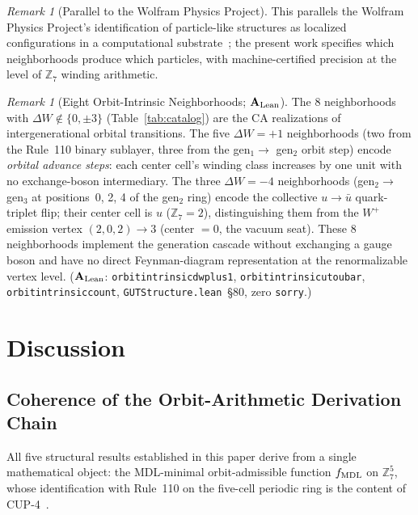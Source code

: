 \documentclass[11pt]{article}
\theoremstyle{remark}
\newtheorem{remark}[theorem]{Remark}
\newcommand{\lean}[1]{%
  \penalty-100
  \begingroup\def\_{\textunderscore\allowbreak}\texttt{#1}\endgroup}
\newcommand{\CatAL}{\ensuremath{\textbf{A}_{\rm Lean}}}
\begin{document}
\begin{remark}[Parallel to the Wolfram Physics Project]
This parallels the Wolfram Physics Project's identification of particle-like
structures as localized configurations in a computational
substrate~\cite{Wolfram2020Tech}; the present work specifies which
neighborhoods produce which particles, with machine-certified precision
at the level of $\mathbb{Z}_7$ winding arithmetic.
\end{remark}

\begin{remark}[Eight Orbit-Intrinsic Neighborhoods; $\CatAL$]
\label{rem:orbit_intrinsic}
The 8 neighborhoods with $\Delta W \notin \{0, \pm 3\}$
(Table~\ref{tab:catalog}) are the CA realizations of intergenerational orbital
transitions.
The five $\Delta W = +1$ neighborhoods (two from the Rule~110 binary sublayer,
three from the gen$_1 \to$ gen$_2$ orbit step) encode \emph{orbital advance
steps}: each center cell's winding class increases by one unit with no
exchange-boson intermediary.
The three $\Delta W = -4$ neighborhoods (gen$_2 \to$ gen$_3$ at positions~0,
2, 4 of the gen$_2$ ring) encode the collective $u \to \bar{u}$ quark-triplet
flip; their center cell is $u$ ($\mathbb{Z}_7 = 2$), distinguishing them from the
$W^+$ emission vertex $(2,0,2) \to 3$ (center $= 0$, the vacuum seat).
These 8 neighborhoods implement the generation cascade without exchanging a gauge
boson and have no direct Feynman-diagram representation at the renormalizable
vertex level.
($\CatAL$: \lean{orbit\_intrinsic\_dw\_plus1}, \lean{orbit\_intrinsic\_u\_to\_ubar},
\lean{orbit\_intrinsic\_count\_8}, \texttt{GUTStructure.lean}~\S80, zero \texttt{sorry}.)
\end{remark}

\section{Discussion}
\label{sec:discussion}

\subsection{Coherence of the Orbit-Arithmetic Derivation Chain}

All five structural results established in this paper derive from a single mathematical
object: the MDL-minimal orbit-admissible function $f_{\rm MDL}$ on $\mathbb{Z}_7^5$,
whose identification with Rule~110 on the five-cell periodic ring is the content of
CUP-4~\cite{SpivackCompUniversality}.
\end{document}
